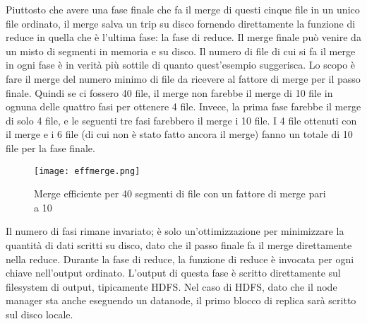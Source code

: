 Piuttosto che avere una fase finale che fa il merge di questi cinque file in un unico file ordinato, il merge salva un trip su disco fornendo direttamente la funzione di reduce in quella che è l'ultima fase: la fase di reduce. Il merge finale può venire da un misto di segmenti in memoria e su disco. Il numero di file di cui si fa il merge in ogni fase è in verità più sottile di quanto quest'esempio suggerisca. Lo scopo è fare il merge del numero minimo di file da ricevere al fattore di merge per il passo finale. Quindi se ci fossero 40 file, il merge non farebbe il merge di 10 file in ognuna delle quattro fasi per ottenere 4 file. Invece, la prima fase farebbe il merge di solo 4 file, e le seguenti tre fasi farebbero il merge i 10 file. I 4 file ottenuti con il merge e i 6 file (di cui non è stato fatto ancora il merge) fanno un totale di 10 file per la fase finale.
\begin{figure}
  \begin{center}
    \texttt{[image: effmerge.png]}
    \caption{Merge efficiente per 40 segmenti di file con un fattore di merge pari a 10}
    \label{fig:merge}
  \end{center}
\end{figure}
Il numero di fasi rimane invariato; è solo un'ottimizzazione per minimizzare la quantità di dati scritti su disco, dato che il passo finale fa il merge direttamente nella reduce.
Durante la fase di reduce, la funzione di reduce è invocata per ogni chiave nell'output ordinato. L'output di questa fase è scritto direttamente sul filesystem di output, tipicamente HDFS. Nel caso di HDFS, dato che il node manager sta anche eseguendo un datanode, il primo blocco di replica sarà scritto sul disco locale.
\newpage
